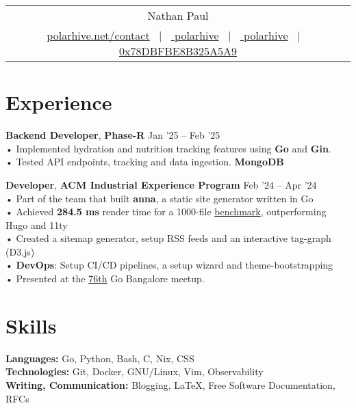 \documentclass[a4,12pt]{article}
\begin{document}
\begin{tabularx}{\linewidth}{@{}C@{}}
\Huge{Nathan Paul} \\[10pt]
\href{https://polarhive.net}{ polarhive.net/contact} \ $|$ \
\href{https://github.com/polarhive}{ polarhive} \ $|$ \
\href{https://linkedin.com/in/polarhive}{ polarhive} \ $|$ \
\href{https://polarhive.net/email}{ 0x78DBFBE8B325A5A9}
\end{tabularx}

\section{Experience}
\textbf{Backend Developer}, \textbf{Phase-R} \hfill Jan '25 – Feb '25 \\
• Implemented hydration and nutrition tracking features using \textbf{Go} and \textbf{Gin}. \\
• Tested API endpoints, tracking and data ingestion. \textbf{MongoDB}

\textbf{Developer}, \textbf{ACM Industrial Experience Program} \hfill Feb '24 – Apr '24 \\
• Part of the team that built \textbf{anna}, a static site generator written in Go \\
• Achieved \textbf{284.5 ms} render time for a 1000-file \href{https://github.com/anna-ssg/anna/actions}{benchmark}, outperforming Hugo and 11ty \\
• Created a sitemap generator, setup RSS feeds and an interactive tag-graph (D3.js) \\
• \textbf{DevOps}: Setup CI/CD pipelines, a setup wizard and theme-bootstrapping \\
• Presented at the \href{https://www.meetup.com/golang-bangalore/events/301697429/}{76th} Go Bangalore meetup.

\section{Skills}
\textbf{Languages:} Go, Python, Bash, C, Nix, CSS \\
\textbf{Technologies:} Git, Docker, GNU/Linux, Vim, Observability \\
\textbf{Writing, Communication:} Blogging, \LaTeX, Free Software Documentation, RFCs

\end{document}
